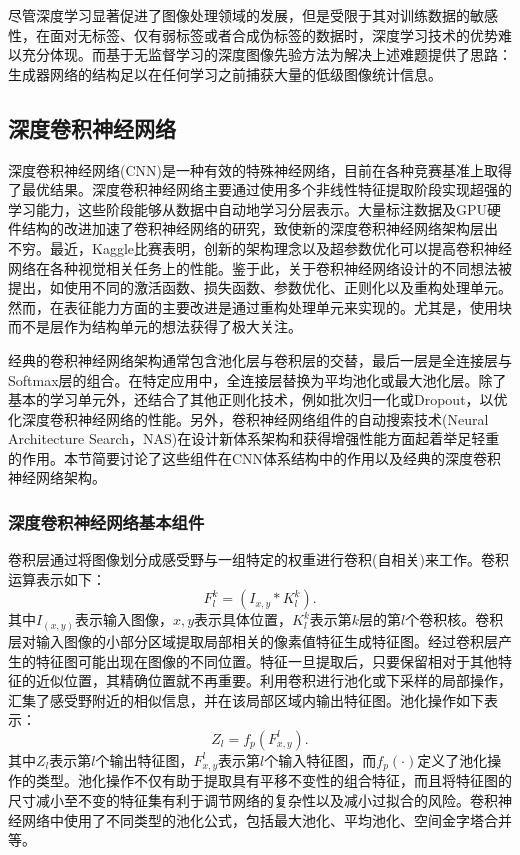尽管深度学习显著促进了图像处理领域的发展，但是受限于其对训练数据的敏感性，在面对无标签、仅有弱标签或者合成伪标签的数据时，深度学习技术的优势难以充分体现。而基于无监督学习的深度图像先验方法为解决上述难题提供了思路：生成器网络的结构足以在任何学习之前捕获大量的低级图像统计信息。

\subsection{深度卷积神经网络}
深度卷积神经网络(CNN)是一种有效的特殊神经网络，目前在各种竞赛基准上取得了最优结果\supercite{Alex,Simonyan,Kaiming,Ronneberger}。深度卷积神经网络主要通过使用多个非线性特征提取阶段实现超强的学习能力，这些阶段能够从数据中自动地学习分层表示。大量标注数据及GPU硬件结构的改进加速了卷积神经网络的研究，致使新的深度卷积神经网络架构层出 不穷。最近，Kaggle比赛表明，创新的架构理念以及超参数优化可以提高卷积神经网络在各种视觉相关任务上的性能。鉴于此，关于卷积神经网络设计的不同想法被提出，如使用不同的激活函数、损失函数、参数优化、正则化以及重构处理单元。然而，在表征能力方面的主要改进是通过重构处理单元来实现的。尤其是，使用块而不是层作为结构单元的想法获得了极大关注\supercite{GeDaohui}。

经典的卷积神经网络架构通常包含池化层与卷积层的交替，最后一层是全连接层与Softmax层的组合。在特定应用中，全连接层替换为平均池化或最大池化层。除了基本的学习单元外，还结合了其他正则化技术，例如批次归一化或Dropout，以优化深度卷积神经网络的性能。另外，卷积神经网络组件的自动搜索技术(Neural Architecture Search，NAS)在设计新体系架构和获得增强性能方面起着举足轻重的作用。本节简要讨论了这些组件在CNN体系结构中的作用以及经典的深度卷积神经网络架构。
\subsubsection{深度卷积神经网络基本组件}
卷积层通过将图像划分成感受野与一组特定的权重进行卷积(自相关)来工作。卷积运算表示如下：
\begin{equation} \label{conv}
	F_l^k=(I_{x,y}\ast{K_l^{k}}).
\end{equation}
其中$I_{(x,y)}$表示输入图像，$x,y$表示具体位置，$K_l^k$表示第$k$层的第$l$个卷积核。卷积层对输入图像的小部分区域提取局部相关的像素值特征生成特征图。经过卷积层产生的特征图可能出现在图像的不同位置。特征一旦提取后，只要保留相对于其他特征的近似位置，其精确位置就不再重要。利用卷积进行池化或下采样的局部操作，汇集了感受野附近的相似信息，并在该局部区域内输出特征图。池化操作如下表示：
\begin{equation} \label{pool}
	Z_l=f_p({F_{x,y}^l}).
\end{equation}
其中$Z_l$表示第$l$个输出特征图，$F_{x,y}^l$表示第$l$个输入特征图，而$f_p(\cdot)$定义了池化操作的类型。池化操作不仅有助于提取具有平移不变性的组合特征，而且将特征图的尺寸减小至不变的特征集有利于调节网络的复杂性以及减小过拟合的风险。卷积神经网络中使用了不同类型的池化公式，包括最大池化、平均池化、空间金字塔合并等。

